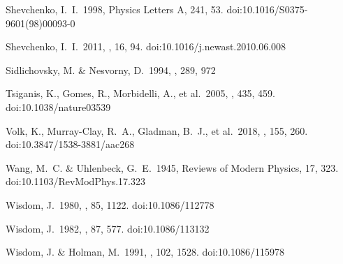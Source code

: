 \documentclass[twocolumn]{aastex62}
\begin{document}
\begin{thebibliography}{00}
 Shevchenko, I.~I.\ 1998, Physics Letters A, 241, 53. doi:10.1016/S0375-9601(98)00093-0

 Shevchenko, I.~I.\ 2011, \na, 16, 94. doi:10.1016/j.newast.2010.06.008

 Sidlichovsky, M. \& Nesvorny, D.\ 1994, \aap, 289, 972



 Tsiganis, K., Gomes, R., Morbidelli, A., et al.\ 2005, \nat, 435, 459. doi:10.1038/nature03539




 Volk, K., Murray-Clay, R.~A., Gladman, B.~J., et al.\ 2018, \aj, 155, 260. doi:10.3847/1538-3881/aac268


 Wang, M.~C. \& Uhlenbeck, G.~E.\ 1945, Reviews of Modern Physics, 17, 323. doi:10.1103/RevModPhys.17.323

 Wisdom, J.\ 1980, \aj, 85, 1122. doi:10.1086/112778

 Wisdom, J.\ 1982, \aj, 87, 577. doi:10.1086/113132

 Wisdom, J. \& Holman, M.\ 1991, \aj, 102, 1528. doi:10.1086/115978






\end{thebibliography}

\end{document}
